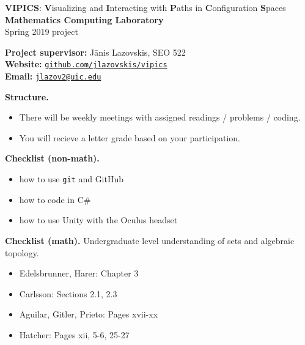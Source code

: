 \documentclass[10pt]{article}
\begin{document}
\def\vspacing{\vspace{.6cm}}

\noindent

\begin{center}
\large \textbf{VIPICS}: \textbf{V}isualizing and \textbf{I}nteracting with \textbf{P}aths in \textbf{C}onfiguration \textbf{S}paces
\\[5pt]\normalsize \textbf{Mathematics Computing Laboratory} \\
Spring 2019 project
\end{center}

\vspacing
 
\noindent
\textbf{Project supervisor:} J\=anis Lazovskis, SEO 522 \\
\textbf{Website:} \href{https://github.com/jlazovskis/vipics}{\texttt{github.com/jlazovskis/vipics}} \\
\textbf{Email:}  \href{mailto:jlazov2@uic.edu}{\nolinkurl{jlazov2@uic.edu}}

\vspacing

\noindent
\textbf{Structure.}
\begin{itemize}
\item There will be weekly meetings with assigned readings / problems / coding. 
\item You will recieve a letter grade based on your participation.
\end{itemize}

\vspacing

\noindent
\textbf{Checklist (non-math).} 
\begin{itemize}
\item how to use \texttt{git} and GitHub
\item how to code in C\#
\item how to use Unity with the Oculus headset
\end{itemize}

\vspacing

\noindent
\textbf{Checklist (math).} Undergraduate level understanding of sets and algebraic topology.
\begin{itemize}
\item Edelsbrunner, Harer: Chapter 3
\item Carlsson: Sections 2.1, 2.3
\item Aguilar, Gitler, Prieto: Pages xvii-xx
\item Hatcher: Pages xii, 5-6, 25-27
\end{itemize}
\end{document}
